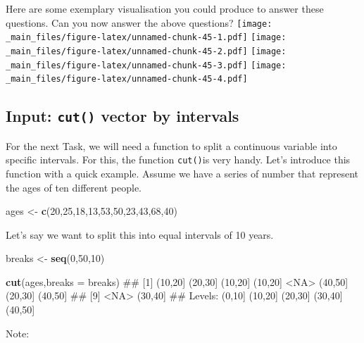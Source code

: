 \documentclass[]{book}
\newenvironment{Shaded}{\begin{snugshade}}{\end{snugshade}}
\newcommand{\KeywordTok}[1]{\textcolor[rgb]{0.13,0.29,0.53}{\textbf{{#1}}}}
\newcommand{\DataTypeTok}[1]{\textcolor[rgb]{0.13,0.29,0.53}{{#1}}}
\newcommand{\DecValTok}[1]{\textcolor[rgb]{0.00,0.00,0.81}{{#1}}}
\newcommand{\StringTok}[1]{\textcolor[rgb]{0.31,0.60,0.02}{{#1}}}
\newcommand{\NormalTok}[1]{{#1}}
\theoremstyle{definition}
\theoremstyle{definition}
\theoremstyle{definition}
\theoremstyle{remark}
\begin{document}
Here are some exemplary visualisation you could produce to answer these
questions. Can you now answer the above questions?
\texttt{[image: \_main\_files/figure-latex/unnamed-chunk-45-1.pdf]}
\texttt{[image: \_main\_files/figure-latex/unnamed-chunk-45-2.pdf]}
\texttt{[image: \_main\_files/figure-latex/unnamed-chunk-45-3.pdf]}
\texttt{[image: \_main\_files/figure-latex/unnamed-chunk-45-4.pdf]}

\subsection{\texorpdfstring{Input: \texttt{cut()} vector by
intervals}{Input: cut() vector by intervals}}\label{input-cut-vector-by-intervals}

For the next Task, we will need a function to split a continuous
variable into specific intervals. For this, the function
\texttt{cut()}is very handy. Let's introduce this function with a quick
example. Assume we have a series of number that represent the ages of
ten different people.

\begin{Shaded}
\begin{Highlighting}[]
\NormalTok{ages <-}\StringTok{ }\KeywordTok{c}\NormalTok{(}\DecValTok{20}\NormalTok{,}\DecValTok{25}\NormalTok{,}\DecValTok{18}\NormalTok{,}\DecValTok{13}\NormalTok{,}\DecValTok{53}\NormalTok{,}\DecValTok{50}\NormalTok{,}\DecValTok{23}\NormalTok{,}\DecValTok{43}\NormalTok{,}\DecValTok{68}\NormalTok{,}\DecValTok{40}\NormalTok{)}
\end{Highlighting}
\end{Shaded}

Let's say we want to split this into equal intervals of 10 years.

\begin{Shaded}
\begin{Highlighting}[]
\NormalTok{breaks <-}\StringTok{ }\KeywordTok{seq}\NormalTok{(}\DecValTok{0}\NormalTok{,}\DecValTok{50}\NormalTok{,}\DecValTok{10}\NormalTok{)}

\KeywordTok{cut}\NormalTok{(ages,}\DataTypeTok{breaks =} \NormalTok{breaks)}
\NormalTok{##  [1] (10,20] (20,30] (10,20] (10,20] <NA>    (40,50] (20,30] (40,50]}
\NormalTok{##  [9] <NA>    (30,40]}
\NormalTok{## Levels: (0,10] (10,20] (20,30] (30,40] (40,50]}
\end{Highlighting}
\end{Shaded}

Note:
\end{document}
